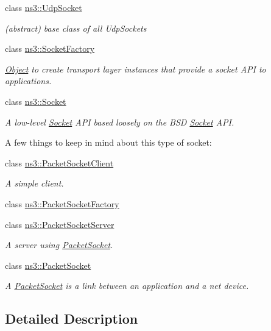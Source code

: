 \begin{DoxyCompactItemize}
class \hyperlink{classns3_1_1UdpSocket}{ns3\+::\+Udp\+Socket}
\begin{DoxyCompactList}\small\item\em (abstract) base class of all Udp\+Sockets \end{DoxyCompactList}\item 
class \hyperlink{classns3_1_1SocketFactory}{ns3\+::\+Socket\+Factory}
\begin{DoxyCompactList}\small\item\em \hyperlink{classns3_1_1Object}{Object} to create transport layer instances that provide a socket A\+PI to applications. \end{DoxyCompactList}\item 
class \hyperlink{classns3_1_1Socket}{ns3\+::\+Socket}
\begin{DoxyCompactList}\small\item\em A low-\/level \hyperlink{classns3_1_1Socket}{Socket} A\+PI based loosely on the B\+SD \hyperlink{classns3_1_1Socket}{Socket} A\+PI.

A few things to keep in mind about this type of socket\+: \end{DoxyCompactList}\item 
class \hyperlink{classns3_1_1PacketSocketClient}{ns3\+::\+Packet\+Socket\+Client}
\begin{DoxyCompactList}\small\item\em A simple client. \end{DoxyCompactList}\item 
class \hyperlink{classns3_1_1PacketSocketFactory}{ns3\+::\+Packet\+Socket\+Factory}
\item 
class \hyperlink{classns3_1_1PacketSocketServer}{ns3\+::\+Packet\+Socket\+Server}
\begin{DoxyCompactList}\small\item\em A server using \hyperlink{classns3_1_1PacketSocket}{Packet\+Socket}. \end{DoxyCompactList}\item 
class \hyperlink{classns3_1_1PacketSocket}{ns3\+::\+Packet\+Socket}
\begin{DoxyCompactList}\small\item\em A \hyperlink{classns3_1_1PacketSocket}{Packet\+Socket} is a link between an application and a net device. \end{DoxyCompactList}\end{DoxyCompactItemize}


\subsection{Detailed Description}
